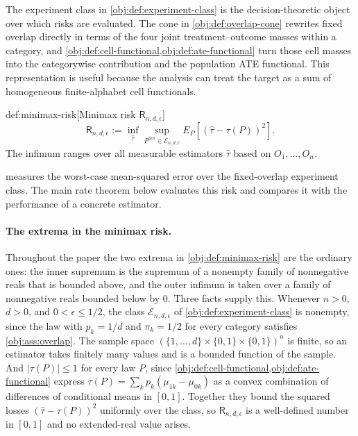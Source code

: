 \documentclass[11pt]{article}
\begin{document}
The experiment class in \cref{obj:def:experiment-class} is the decision-theoretic object over which risks are evaluated. The cone in \cref{obj:def:overlap-cone} rewrites fixed overlap directly in terms of the four joint treatment--outcome masses within a category, and \cref{obj:def:cell-functional,obj:def:ate-functional} turn those cell masses into the categorywise contribution and the population ATE functional. This representation is useful because the analysis can treat the target as a sum of homogeneous finite-alphabet cell functionals.

\begin{definitionv}{def:minimax-risk}[Minimax risk \(\mathsf R_{n,d,\epsilon}\)]
\[
\mathsf R_{n,d,\epsilon}
:=
\inf_{\widehat\tau}
\sup_{P^{\otimes n}\in\mathcal E_{n,d,\epsilon}}
E_P\!\left[(\widehat\tau-\tau(P))^2\right].
\]
The infimum ranges over all measurable estimators \(\widehat\tau\) based on \(O_1,\ldots,O_n\).
\end{definitionv}

 measures the worst-case mean-squared error over the fixed-overlap experiment class. The main rate theorem below evaluates this risk and compares it with the performance of a concrete estimator.

\paragraph{The extrema in the minimax risk.}
Throughout the paper the two extrema in \cref{obj:def:minimax-risk} are the ordinary ones: the inner supremum is the supremum of a nonempty family of nonnegative reals that is bounded above, and the outer infimum is taken over a family of nonnegative reals bounded below by \(0\). Three facts supply this. Whenever \(n>0\), \(d>0\), and \(0<\epsilon\le1/2\), the class \(\mathcal E_{n,d,\epsilon}\) of \cref{obj:def:experiment-class} is nonempty, since the law with \(p_k=1/d\) and \(\pi_k=1/2\) for every category satisfies \cref{obj:ass:overlap}. The sample space \((\{1,\ldots,d\}\times\{0,1\}\times\{0,1\})^n\) is finite, so an estimator takes finitely many values and is a bounded function of the sample. And \(|\tau(P)|\le1\) for every law \(P\), since \cref{obj:def:cell-functional,obj:def:ate-functional} express \(\tau(P)=\sum_kp_k(\mu_{1k}-\mu_{0k})\) as a convex combination of differences of conditional means in \([0,1]\). Together they bound the squared losses \((\widehat\tau-\tau(P))^2\) uniformly over the class, so \(\mathsf R_{n,d,\epsilon}\) is a well-defined number in \([0,1]\) and no extended-real value arises.
\end{document}
